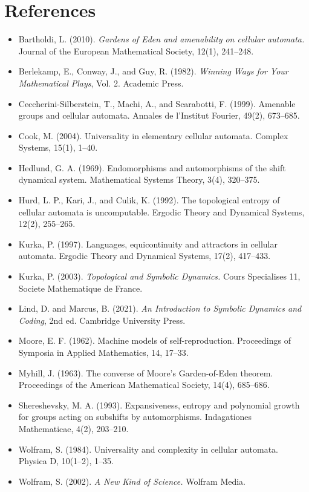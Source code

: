\section{References}

\begin{itemize}
\item Bartholdi, L. (2010). \textit{Gardens of Eden and amenability on cellular automata.} Journal of the European Mathematical Society, 12(1), 241--248.
\item Berlekamp, E., Conway, J., and Guy, R. (1982). \textit{Winning Ways for Your Mathematical Plays}, Vol. 2. Academic Press.
\item Ceccherini-Silberstein, T., Machi, A., and Scarabotti, F. (1999). Amenable groups and cellular automata. Annales de l'Institut Fourier, 49(2), 673--685.
\item Cook, M. (2004). Universality in elementary cellular automata. Complex Systems, 15(1), 1--40.
\item Hedlund, G. A. (1969). Endomorphisms and automorphisms of the shift dynamical system. Mathematical Systems Theory, 3(4), 320--375.
\item Hurd, L. P., Kari, J., and Culik, K. (1992). The topological entropy of cellular automata is uncomputable. Ergodic Theory and Dynamical Systems, 12(2), 255--265.
\item Kurka, P. (1997). Languages, equicontinuity and attractors in cellular automata. Ergodic Theory and Dynamical Systems, 17(2), 417--433.
\item Kurka, P. (2003). \textit{Topological and Symbolic Dynamics.} Cours Specialises 11, Societe Mathematique de France.
\item Lind, D. and Marcus, B. (2021). \textit{An Introduction to Symbolic Dynamics and Coding}, 2nd ed. Cambridge University Press.
\item Moore, E. F. (1962). Machine models of self-reproduction. Proceedings of Symposia in Applied Mathematics, 14, 17--33.
\item Myhill, J. (1963). The converse of Moore's Garden-of-Eden theorem. Proceedings of the American Mathematical Society, 14(4), 685--686.
\item Shereshevsky, M. A. (1993). Expansiveness, entropy and polynomial growth for groups acting on subshifts by automorphisms. Indagationes Mathematicae, 4(2), 203--210.
\item Wolfram, S. (1984). Universality and complexity in cellular automata. Physica D, 10(1--2), 1--35.
\item Wolfram, S. (2002). \textit{A New Kind of Science.} Wolfram Media.
\end{itemize}



